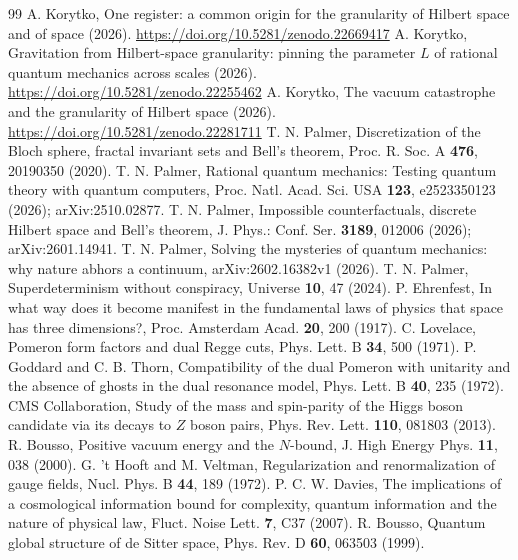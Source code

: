 \documentclass[aps,prd,twocolumn,superscriptaddress,nofootinbib]{revtex4-2}
\begin{document}
\begin{thebibliography}{99}
 A. Korytko, One register: a common origin for the granularity of Hilbert space and of space (2026). \mbox{\url{https://doi.org/10.5281/zenodo.22669417}}
 A. Korytko, Gravitation from Hilbert-space granularity: pinning the parameter $L$ of rational quantum mechanics across scales (2026). \mbox{\url{https://doi.org/10.5281/zenodo.22255462}}
 A. Korytko, The vacuum catastrophe and the granularity of Hilbert space (2026). \mbox{\url{https://doi.org/10.5281/zenodo.22281711}}
 T. N. Palmer, Discretization of the Bloch sphere, fractal invariant sets and Bell's theorem, Proc. R. Soc. A \textbf{476}, 20190350 (2020).
 T. N. Palmer, Rational quantum mechanics: Testing quantum theory with quantum computers, Proc. Natl. Acad. Sci. USA \textbf{123}, e2523350123 (2026); arXiv:2510.02877.
 T. N. Palmer, Impossible counterfactuals, discrete Hilbert space and Bell's theorem, J. Phys.: Conf. Ser. \textbf{3189}, 012006 (2026); arXiv:2601.14941.
 T. N. Palmer, Solving the mysteries of quantum mechanics: why nature abhors a continuum, arXiv:2602.16382v1 (2026).
 T. N. Palmer, Superdeterminism without conspiracy, Universe \textbf{10}, 47 (2024).
 P. Ehrenfest, In what way does it become manifest in the fundamental laws of physics that space has three dimensions?, Proc. Amsterdam Acad. \textbf{20}, 200 (1917).
 C. Lovelace, Pomeron form factors and dual Regge cuts, Phys. Lett. B \textbf{34}, 500 (1971).
 P. Goddard and C. B. Thorn, Compatibility of the dual Pomeron with unitarity and the absence of ghosts in the dual resonance model, Phys. Lett. B \textbf{40}, 235 (1972).
 CMS Collaboration, Study of the mass and spin-parity of the Higgs boson candidate via its decays to $Z$ boson pairs, Phys. Rev. Lett. \textbf{110}, 081803 (2013).
 R. Bousso, Positive vacuum energy and the $N$-bound, J. High Energy Phys. \textbf{11}, 038 (2000).
 G. 't Hooft and M. Veltman, Regularization and renormalization of gauge fields, Nucl. Phys. B \textbf{44}, 189 (1972).
 P. C. W. Davies, The implications of a cosmological information bound for complexity, quantum information and the nature of physical law, Fluct. Noise Lett. \textbf{7}, C37 (2007).
 R. Bousso, Quantum global structure of de Sitter space, Phys. Rev. D \textbf{60}, 063503 (1999).

\end{thebibliography}
\end{document}
